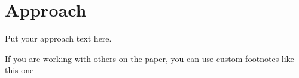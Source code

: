 \section{Approach}
\label{Sec:approach}

Put your approach text here.

If you are working with others on the paper, you can use custom footnotes like this one 
